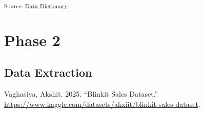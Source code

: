 \documentclass[
  letterpaper,
  DIV=11,
  numbers=noendperiod]{scrartcl}
\newlength{\cslhangindent}
\newenvironment{CSLReferences}[2] %
 {\begin{list}{}{%
  \setlength{\itemindent}{0pt}
  \setlength{\leftmargin}{0pt}
  \setlength{\parsep}{0pt}
  \ifodd #1
   \setlength{\leftmargin}{\cslhangindent}
   \setlength{\itemindent}{-1\cslhangindent}
  \fi
  \setlength{\itemsep}{#2\baselineskip}}}
 {\end{list}}
\begin{document}
\textsubscript{Source:
\href{https://plot-masters.github.io/customer-segmentation/notebook/customer_segmentation_model-preview.html\#cell-2}{Data
Dictionary}}

\section{Phase 2}\label{phase-2}

\subsection*{Data Extraction}\label{data-extraction}

\label{refs}
\begin{CSLReferences}{1}{0}
Vaghasiya, Akshit. 2025. {``Blinkit {Sales} {Dataset}.''}
\url{https://www.kaggle.com/datasets/akxiit/blinkit-sales-dataset}.

\end{CSLReferences}
\end{document}
